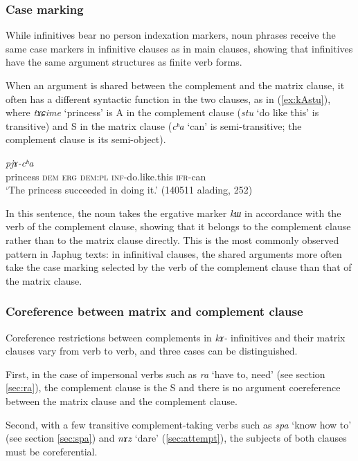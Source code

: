 \documentclass[oneside,a4paper,11pt]{article}
\newcommand{\ipa}[1]{\textit{\phon#1}}
\newcommand{\jpg}[2]{\ipa{#1} `#2'}
\newcommand{\refb}[1]{(\ref{#1})}
\begin{document}
\subsubsection{Case marking} \label{sec:case.infinitive}
While infinitives bear no person indexation markers, noun phrases receive the same case markers in infinitive clauses as in main clauses, showing that infinitives have the same argument structures as finite verb forms.

When an argument is shared between the complement and the matrix clause, it often has a different syntactic function in the two clauses, as in \refb{ex:kAstu}, where \ipa{tɤɕime} `princess' is A in the complement clause (\jpg{stu}{do like this} is transitive) and S in the matrix clause (\jpg{cʰa}{can} is semi-transitive; the complement clause is its semi-object). 

\begin{exe}
\ex \label{ex:kAstu}
\gll [\ipa{tɤɕime} 	\ipa{nɯ} 	\ipa{kɯ} 	\ipa{nɯra} 	\ipa{kɤ-stu}] 	\ipa{pjɤ-cʰa} \\
princess \textsc{dem} \textsc{erg} \textsc{dem:pl} \textsc{inf}-do.like.this \textsc{ifr}-can \\
\glt `The princess succeeded in doing it.' (140511 alading, 252)
\end{exe}

In this sentence, the noun takes the ergative marker \ipa{kɯ} in accordance with the verb of the complement clause, showing that it belongs to the complement clause rather than to the matrix clause directly. This is the most commonly observed pattern in Japhug texts: in infinitival clauses, the shared arguments more often take the case marking selected by the verb of the complement clause than that of the matrix clause.

\subsubsection{Coreference between matrix and complement clause} \label{sec:inf.coref}
Coreference restrictions between complements in \ipa{kɤ-} infinitives and their matrix clauses vary from verb to verb, and three cases can be distinguished.


First, in the case of impersonal verbs such as \jpg{ra}{have to, need} (see section \ref{sec:ra}), the complement clause is the S and there is no argument coereference between the matrix clause and the complement clause.

Second, with a few transitive complement-taking verbs such as \ipa{spa} `know how to' (see section \ref{sec:spa}) and \ipa{nɤz} `dare' (\ref{sec:attempt}), the subjects of both clauses must be coreferential.
\end{document}
